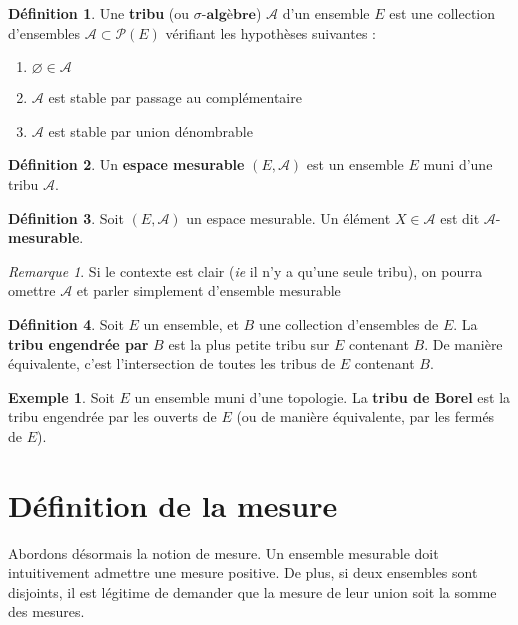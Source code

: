 \documentclass[french]{report}
\theoremstyle{plain}
\theoremstyle{definition}
\newtheorem{defi}{Définition}[section]
\newtheorem{exemple}{Exemple}[section]
\theoremstyle{remark}
\newtheorem{rem}{Remarque}[section]
\begin{document}
\begin{defi}
  Une \textbf{tribu} (ou $\sigma\textbf{-algèbre}$) $\mathcal{A}$ d'un ensemble $E$ est une collection d'ensembles $\mathcal{A} \subset \mathcal{P}(E)$ vérifiant les hypothèses suivantes :
  \begin{enumerate}
    \item $\varnothing \in \mathcal{A}$
    \item $\mathcal{A}$ est stable par passage au complémentaire
    \item $\mathcal{A}$ est stable par union dénombrable
  \end{enumerate}
\end{defi}

\begin{defi}
  Un \textbf{espace mesurable} $\left(E, \mathcal{A}\right)$ est un ensemble $E$ muni d'une tribu $\mathcal{A}$.
\end{defi}

\begin{defi}
  Soit $\left(E, \mathcal{A}\right)$ un espace mesurable. Un élément $X\in \mathcal{A}$ est dit $\mathcal{A}$-\textbf{mesurable}.
\end{defi}

\begin{rem}
  Si le contexte est clair (\textit{ie} il n'y a qu'une seule tribu), on pourra omettre $\mathcal{A}$ et parler simplement d'ensemble mesurable
\end{rem}

\begin{defi}
  Soit $E$ un ensemble, et $B$ une collection d'ensembles de $E$.
  La \textbf{tribu engendrée par} $B$ est la plus petite tribu sur $E$ contenant $B$.
  De manière équivalente, c'est l'intersection de toutes les tribus de $E$ contenant $B$.
\end{defi}

\begin{exemple}
  \label{ex:borel}
  Soit $E$ un ensemble muni d'une topologie.
  La \textbf{tribu de Borel} est la tribu engendrée par les ouverts de $E$ (ou de manière équivalente, par les fermés de $E$).
\end{exemple}

\section{Définition de la mesure}

Abordons désormais la notion de mesure.
Un ensemble mesurable doit intuitivement admettre une mesure positive.
De plus, si deux ensembles sont disjoints, il est légitime de demander que la mesure de leur union soit la somme des mesures.
\end{document}
